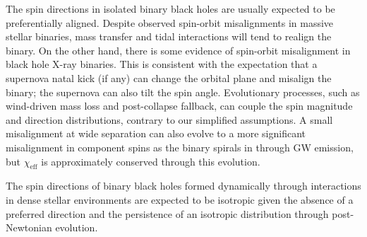 \documentclass{nature-arxiv}
\newcommand{\chieff}{\chi_\mathrm{eff}}
\begin{document}
The spin directions in isolated binary black
holes\cite{TutukovYungelson:1993,2016Natur.534..512B,Stevenson:2017,MandeldeMink:2016,Marchant:2016}
are usually expected to be preferentially aligned.  Despite observed
spin-orbit misalignments in massive stellar
binaries\cite{Albrecht:2009}, mass transfer and tidal interactions
will tend to realign the binary.  On the other hand, there is some
evidence of spin-orbit misalignment in black hole X-ray
binaries\cite{Martin:2008b,MorningstarMiller:2014}.  This is
consistent with the expectation that a supernova natal kick (if any)
can change the orbital plane and misalign the
binary\cite{2000ApJ...541..319K}; the supernova can also tilt the spin
angle\cite{2011ApJ...742...81F}.  Evolutionary processes, such as
wind-driven mass loss and post-collapse fallback, can couple the spin
magnitude and direction distributions, contrary to our simplified
assumptions.  A small misalignment at wide separation can also evolve
to a more significant misalignment in component spins as the binary
spirals in through \ac{GW} emission\cite{2015PhRvD..92f4016G}, but
$\chieff$ is approximately conserved through this evolution.

The spin directions of binary black holes formed dynamically through
interactions in dense stellar
environments\cite{SigurdssonHernquist:1993,PZMcMillan:2000,Rodriguez:2015,Stone:2016}
are expected to be isotropic given the absence of a preferred
direction\cite{2016ApJ...832L...2R} and the persistence of an
isotropic distribution through post-Newtonian
evolution\cite{2004PhRvD..70l4020S,2007ApJ...661L.147B}.
\end{document}

